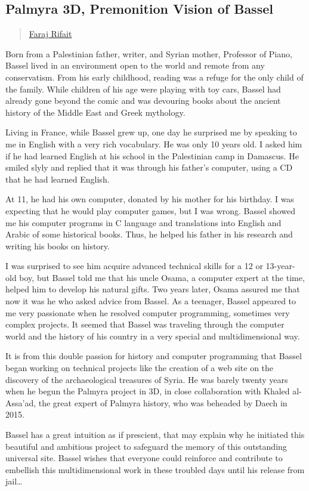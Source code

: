 \subsection{Palmyra 3D, Premonition Vision of
Bassel}\label{palmyra-3d-premonition-vision-of-bassel}

\begin{quote}
\href{../appendix/attributions.html\#faraj-rifait}{Faraj Rifait}
\end{quote}

Born from a Palestinian father, writer, and Syrian mother, Professor of
Piano, Bassel lived in an environment open to the world and remote from
any conservatism. From his early childhood, reading was a refuge for the
only child of the family. While children of his age were playing with
toy cars, Bassel had already gone beyond the comic and was devouring
books about the ancient history of the Middle East and Greek mythology.

Living in France, while Bassel grew up, one day he surprised me by
speaking to me in English with a very rich vocabulary. He was only 10
years old. I asked him if he had learned English at his school in the
Palestinian camp in Damascus. He smiled slyly and replied that it was
through his father's computer, using a CD that he had learned English.

At 11, he had his own computer, donated by his mother for his birthday.
I was expecting that he would play computer games, but I was wrong.
Bassel showed me his computer programs in C language and translations
into English and Arabic of some historical books. Thus, he helped his
father in his research and writing his books on history.

I was surprised to see him acquire advanced technical skills for a 12 or
13-year-old boy, but Bassel told me that his uncle Osama, a computer
expert at the time, helped him to develop his natural gifts. Two years
later, Osama assured me that now it was he who asked advice from Bassel.
As a teenager, Bassel appeared to me very passionate when he resolved
computer programming, sometimes very complex projects. It seemed that
Bassel was traveling through the computer world and the history of his
country in a very special and multidimensional way.

It is from this double passion for history and computer programming that
Bassel began working on technical projects like the creation of a web
site on the discovery of the archaeological treasures of Syria. He was
barely twenty years when he begun the Palmyra project in 3D, in close
collaboration with Khaled al-Assa'ad, the great expert of Palmyra
history, who was beheaded by Daech in 2015.

Bassel has a great intuition as if prescient, that may explain why he
initiated this beautiful and ambitious project to safeguard the memory
of this outstanding universal site. Bassel wishes that everyone could
reinforce and contribute to embellish this multidimensional work in
these troubled days until his release from jail\ldots{}
